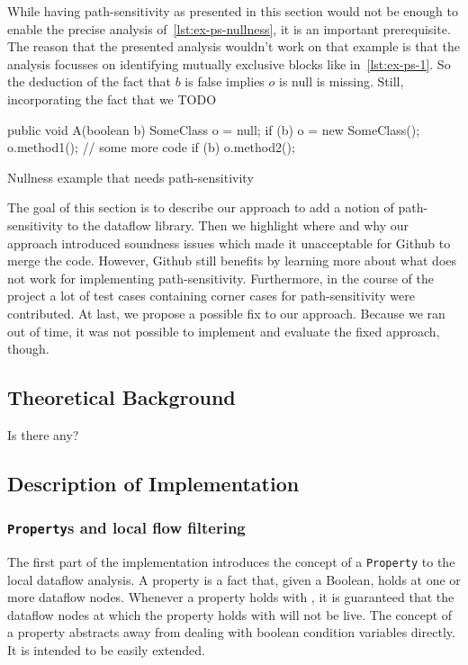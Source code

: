 While having path-sensitivity as presented in this section would not be enough 
to enable the precise analysis of~\autoref{lst:ex-ps-nullness},
it is an important prerequisite.
The reason that the presented analysis wouldn't work on that example is that
the analysis focusses on identifying mutually exclusive blocks like in~\autoref{lst:ex-ps-1}.
So the deduction of the fact that $b$ is false implies $o$ is null is missing.
Still, incorporating the fact that we 
TODO
\begin{listing}
    \begin{javacode}
public void A(boolean b) {
    SomeClass o = null;
    if (b) {
        o = new SomeClass();
        o.method1();
    }
    // some more code
    if (b) {
        o.method2();
    }
}
    \end{javacode}
    \label{lst:ex-ps-nullness}
    \caption{Nullness example that needs path-sensitivity}
\end{listing}




The goal of this section is to describe our approach to add a notion of
path-sensitivity to the dataflow library.
Then we highlight where and why our approach introduced soundness issues
which made it unacceptable for Github to merge the code.
However, Github still benefits by learning more about what does not work
for implementing path-sensitivity.
Furthermore, in the course of the project a lot of test cases containing
corner cases for path-sensitivity were contributed.
At last, we propose a possible fix to our approach. 
Because we ran out of time, it was not possible to implement 
and evaluate the fixed approach, though.



\subsection{Theoretical Background}
Is there any?


\subsection{Description of Implementation}
\subsubsection*{\texttt{Property}s and local flow filtering}
The first part of the implementation introduces the concept of a \texttt{Property}
to the local dataflow analysis.
A property is a fact that, given a Boolean, holds at one or more dataflow nodes.
Whenever a property holds with , it is guaranteed that the dataflow nodes 
at which the property holds with  will not be live.
The concept of a property abstracts away from dealing with boolean condition variables
directly. It is intended to be easily extended.


